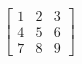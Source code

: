 \documentclass[preview]{standalone}
\begin{document}
\begin{align*}
\begin{bmatrix}1 & 2 & 3 \\4 & 5 & 6 \\7 & 8 & 9\end{bmatrix}
\end{align*}
\end{document}
